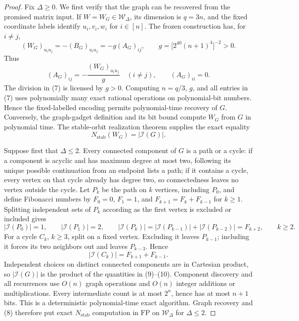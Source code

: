 \documentclass{article}
\begin{document}
\begin{proof}
Fix \(\Delta\geq0\).  We first verify that the graph can be recovered from the promised matrix input.  If \(W=W_G\in\mathcal W_\Delta\), its dimension is \(q=3n\), and the fixed coordinate labels identify \(u_i,v_i,w_i\) for \(i\in[n]\).  The frozen construction has, for \(i\neq j\),
\[
 (W_G)_{u_i u_j}=-(B_G)_{u_i u_j}=-g(A_G)_{ij},
 \qquad
 g=\bigl[2^{40}(n+1)^4\bigr]^{-2}>0. \tag{6}
\]
Thus
\[
 (A_G)_{ij}=-\frac{(W_G)_{u_i u_j}}{g}\quad(i\neq j),
 \qquad (A_G)_{ii}=0. \tag{7}
\]
The division in (7) is licensed by \(g>0\).  Computing \(n=q/3\), \(g\), and all entries in (7) uses polynomially many exact rational operations on polynomial-bit numbers.  Hence the fixed-labelled encoding permits polynomial-time recovery of \(G\).  Conversely, the graph-gadget definition and its bit bound compute \(W_G\) from \(G\) in polynomial time.  The stable-orbit realization theorem supplies the exact equality
\[
 N_{\mathrm{stab}}(W_G)=|\mathcal I(G)|. \tag{8}
\]

Suppose first that \(\Delta\leq2\).  Every connected component of \(G\) is a path or a cycle: if a component is acyclic and has maximum degree at most two, following its unique possible continuation from an endpoint lists a path; if it contains a cycle, every vertex on that cycle already has degree two, so connectedness leaves no vertex outside the cycle.  Let \(P_k\) be the path on \(k\) vertices, including \(P_0\), and define Fibonacci numbers by \(F_0=0\), \(F_1=1\), and \(F_{k+1}=F_k+F_{k-1}\) for \(k\geq1\).  Splitting independent sets of \(P_k\) according as the first vertex is excluded or included gives
\[
 |\mathcal I(P_0)|=1,\qquad |\mathcal I(P_1)|=2,\qquad
 |\mathcal I(P_k)|=|\mathcal I(P_{k-1})|+|\mathcal I(P_{k-2})|=F_{k+2},
 \qquad k\geq2. \tag{9}
\]
For a cycle \(C_k\), \(k\geq3\), split on a fixed vertex.  Excluding it leaves \(P_{k-1}\); including it forces its two neighbors out and leaves \(P_{k-3}\).  Hence
\[
 |\mathcal I(C_k)|=F_{k+1}+F_{k-1}. \tag{10}
\]
Independent choices on distinct connected components are in Cartesian product, so \(|\mathcal I(G)|\) is the product of the quantities in (9)--(10).  Component discovery and all recurrences use \(O(n)\) graph operations and \(O(n)\) integer additions or multiplications.  Every intermediate count is at most \(2^n\), hence has at most \(n+1\) bits.  This is a deterministic polynomial-time exact algorithm.  Graph recovery and (8) therefore put exact \(N_{\mathrm{stab}}\) computation in \(\mathrm{FP}\) on \(\mathcal W_\Delta\) for \(\Delta\leq2\).


\end{proof}
\end{document}
